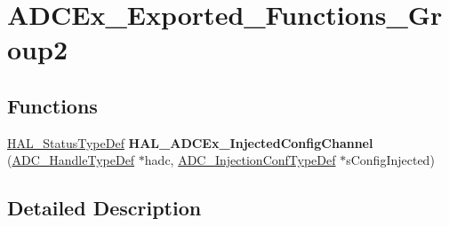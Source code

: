 \hypertarget{group___a_d_c_ex___exported___functions___group2}{}\section{A\+D\+C\+Ex\+\_\+\+Exported\+\_\+\+Functions\+\_\+\+Group2}
\label{group___a_d_c_ex___exported___functions___group2}
\subsection*{Functions}
\begin{DoxyCompactItemize}
\item 
\mbox{\label{group___a_d_c_ex___exported___functions___group2_ga5736a78398eb51ddeb09dd83d1243045}} 
\hyperlink{stm32f1xx__hal__def_8h_a63c0679d1cb8b8c684fbb0632743478f}{H\+A\+L\+\_\+\+Status\+Type\+Def} {\bfseries H\+A\+L\+\_\+\+A\+D\+C\+Ex\+\_\+\+Injected\+Config\+Channel} (\hyperlink{struct_a_d_c___handle_type_def}{A\+D\+C\+\_\+\+Handle\+Type\+Def} $\ast$hadc, \hyperlink{struct_a_d_c___injection_conf_type_def}{A\+D\+C\+\_\+\+Injection\+Conf\+Type\+Def} $\ast$s\+Config\+Injected)
\end{DoxyCompactItemize}


\subsection{Detailed Description}
